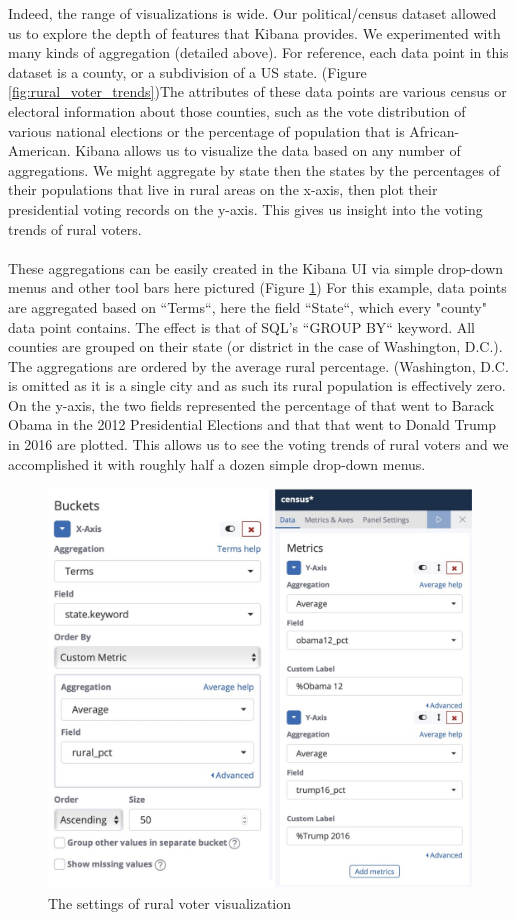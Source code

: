 \documentclass[bibliography=totoc]{article}
\begin{document}
Indeed, the range of visualizations is wide. Our political/census dataset allowed us to explore the depth
of features that Kibana provides. We experimented with many kinds of aggregation (detailed above). For
reference, each data point in this dataset is a county, or a subdivision of a US state. (Figure \ref{fig:rural_voter_trends})The attributes of
these data points are various census or electoral information about those counties, such as the vote
distribution of various national elections or the percentage of population that is African-American. Kibana
allows us to visualize the data based on any number of aggregations. We might aggregate by state then the
states by the percentages of their populations that live in rural areas on the x-axis, then plot their
presidential voting records on the y-axis. This gives us insight into the voting trends of rural voters.
\\
\\
These aggregations can be easily created in the Kibana UI via simple drop-down menus and other tool bars
here pictured (Figure \ref{fig:rural_voters_settings}) For this example, data points are aggregated based on ``Terms``, here the field ``State``,
which every "county" data point contains. The effect is that of SQL's ``GROUP BY`` keyword. All counties are
grouped on their state (or district in the case of Washington, D.C.). The aggregations are ordered by the
average rural percentage. (Washington, D.C. is omitted as it is a single city and as such its rural
population is effectively zero. On the y-axis, the two fields represented the percentage of that went to
Barack Obama in the 2012 Presidential Elections and that that went to Donald Trump in 2016 are plotted. This
allows us to see the voting trends of rural voters and we accomplished it with roughly half a dozen simple
drop-down menus.
\begin{figure}[!htb]
  \centering
  \includegraphics[height=0.5\textwidth]{rural_voters_settings.png}
 \caption{The settings of rural voter visualization}
  \label{fig:rural_voters_settings}
\end{figure}
\end{document}
